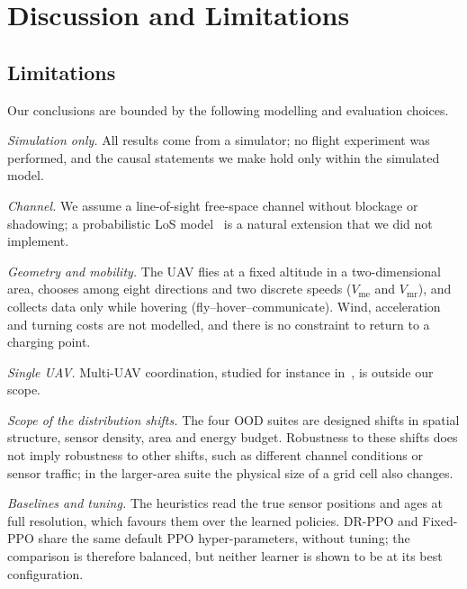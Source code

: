 \section{Discussion and Limitations}

\subsection{Limitations}
Our conclusions are bounded by the following modelling and evaluation choices.

\emph{Simulation only.} All results come from a simulator; no flight experiment was
performed, and the causal statements we make hold only within the simulated model.

\emph{Channel.} We assume a line-of-sight free-space channel without blockage or
shadowing; a probabilistic LoS model~\cite{alhourani2014optimal} is a natural extension
that we did not implement.

\emph{Geometry and mobility.} The UAV flies at a fixed altitude in a two-dimensional
area, chooses among eight directions and two discrete speeds ($V_{\mathrm{me}}$ and
$V_{\mathrm{mr}}$), and collects data only while hovering (fly--hover--communicate).
Wind, acceleration and turning costs are not modelled, and there is no constraint to
return to a charging point.

\emph{Single UAV.} Multi-UAV coordination, studied for instance
in~\cite{bayerlein2021multi,sun2025aoi}, is outside our scope.

\emph{Scope of the distribution shifts.} The four OOD suites are designed shifts in
spatial structure, sensor density, area and energy budget. Robustness to these shifts
does not imply robustness to other shifts, such as different channel conditions or
sensor traffic; in the larger-area suite the physical size of a grid cell also changes.

\emph{Baselines and tuning.} The heuristics read the true sensor positions and ages at
full resolution, which favours them over the learned policies. DR-PPO and Fixed-PPO share
the same default PPO hyper-parameters, without tuning; the comparison is therefore
balanced, but neither learner is shown to be at its best configuration.

